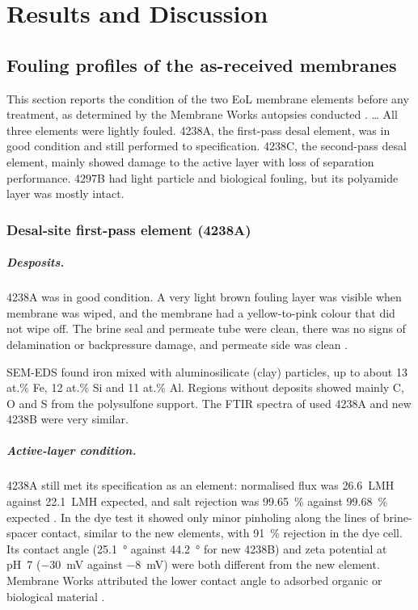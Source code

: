 \chapter{Results and Discussion}
\label{ch:results}


\section{Fouling profiles of the as-received membranes}
\label{sec:res-fouling}
This section reports the condition of the two EoL membrane elements before any treatment, as determined by the Membrane Works autopsies conducted \citep{MembraneWorks2025Desal,MembraneWorks2026Mine}. … All three elements were lightly fouled. 4238A, the first-pass desal element, was in good condition and still performed to specification. 4238C, the second-pass desal element, mainly showed damage to the active layer with loss of separation performance. 4297B had light particle and biological fouling, but its polyamide layer was mostly intact.

\subsection{Desal-site first-pass element (4238A)}
\label{sec:red-fouling-4238A}
\paragraph{Desposits.}
4238A was in good condition. A very light brown fouling layer was visible when membrane was wiped, and the membrane had a yellow-to-pink colour that did not wipe off. The brine seal and permeate tube were clean, there was no signs of delamination or backpressure damage, and permeate side was clean \citep{MembraneWorks2025Desal}.

SEM-EDS found iron mixed with aluminosilicate (clay) particles, up to about 13 at.\% Fe, 12 at.\% Si and 11 at.\% Al. Regions without deposits showed mainly C, O and S from the polysulfone support. The FTIR spectra of used 4238A and new 4238B were very similar.

\paragraph{Active-layer condition.}
4238A still met its specification as an element: normalised flux was \qty{26.6}{LMH} against \qty{22.1}{LMH} expected, and salt rejection was \qty{99.65}{\percent} against \qty{99.68}{\percent} expected \citep{MembraneWorks2025Desal}. In the dye test it showed only minor pinholing along the lines of brine-spacer contact, similar to the new elements, with \qty{91}{\percent} rejection in the dye cell. Its contact angle (\qty{25.1}{\degree} against \qty{44.2}{\degree} for new 4238B) and zeta potential at pH~7 (\qty{-30}{mV} against \qty{-8}{mV}) were both different from the new element. Membrane Works attributed the lower contact angle to adsorbed organic or biological material \citep{MembraneWorks2025Desal}.

